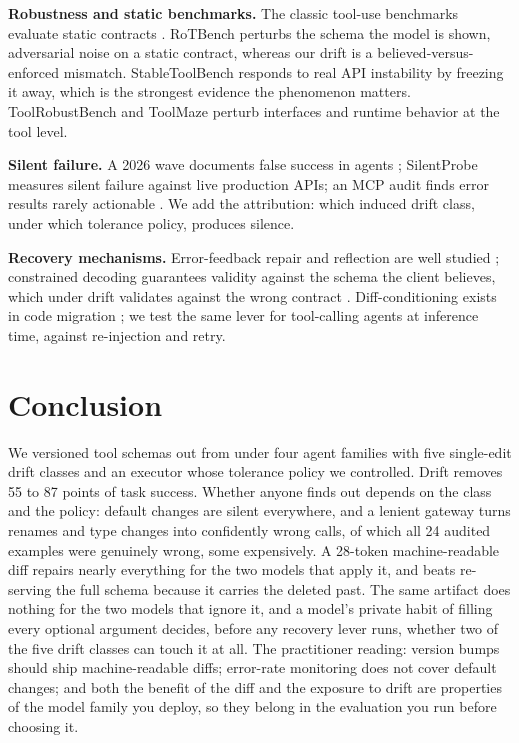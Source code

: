 \textbf{Robustness and static benchmarks.} The classic tool-use benchmarks evaluate static contracts \citep{toolllm, apibank, toolalpaca, teval, taubench, agentbench, toolemu, metatool, bfcl}. RoTBench \citep{rotbench} perturbs the schema the model is shown, adversarial noise on a static contract, whereas our drift is a believed-versus-enforced mismatch. StableToolBench \citep{stabletool} responds to real API instability by freezing it away, which is the strongest evidence the phenomenon matters. ToolRobustBench \citep{toolrobust} and ToolMaze \citep{toolmaze} perturb interfaces and runtime behavior at the tool level.

\textbf{Silent failure.} A 2026 wave documents false success in agents \citep{falsesuccess, errnarratives, reflecterr}; SilentProbe \citep{silentprobe} measures silent failure against live production APIs; an MCP audit finds error results rarely actionable \citep{mcpaction}. We add the attribution: which induced drift class, under which tolerance policy, produces silence.

\textbf{Recovery mechanisms.} Error-feedback repair and reflection are well studied \citep{reflexion, critic, structreflect, toolcritic, structfeedback, backfires, selfreflective, bench2robust, agentcheck}; constrained decoding guarantees validity against the schema the client believes, which under drift validates against the wrong contract \citep{tooldec}. Diff-conditioning exists in code migration \citep{whatadiff, deprepair, recode}; we test the same lever for tool-calling agents at inference time, against re-injection and retry.

\section{Conclusion}

We versioned tool schemas out from under four agent families with five single-edit drift classes and an executor whose tolerance policy we controlled. Drift removes 55 to 87 points of task success. Whether anyone finds out depends on the class and the policy: default changes are silent everywhere, and a lenient gateway turns renames and type changes into confidently wrong calls, of which all 24 audited examples were genuinely wrong, some expensively. A 28-token machine-readable diff repairs nearly everything for the two models that apply it, and beats re-serving the full schema because it carries the deleted past. The same artifact does nothing for the two models that ignore it, and a model's private habit of filling every optional argument decides, before any recovery lever runs, whether two of the five drift classes can touch it at all. The practitioner reading: version bumps should ship machine-readable diffs; error-rate monitoring does not cover default changes; and both the benefit of the diff and the exposure to drift are properties of the model family you deploy, so they belong in the evaluation you run before choosing it.

